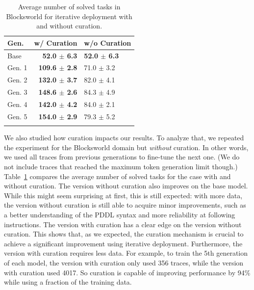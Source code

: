 \begin{table}
\vspace{-10pt}
\centering
\begin{tabular}{lrl}
\toprule
\textbf{Gen.} & \textbf{w/ Curation}     & \textbf{w/o Curation}   \\ \midrule
Base          & \textbf{52.0 $\pm$ 6.3}  & \textbf{52.0 $\pm$ 6.3} \\
Gen. 1        & \textbf{109.6 $\pm$ 2.8} & 71.0 $\pm$ 3.2          \\
Gen. 2        & \textbf{132.0 $\pm$ 3.7} & 82.0 $\pm$ 4.1          \\
Gen. 3        & \textbf{148.6 $\pm$ 2.6} & 84.3 $\pm$ 4.9          \\
Gen. 4        & \textbf{142.0 $\pm$ 4.2} & 84.0 $\pm$ 2.1          \\
Gen. 5        & \textbf{154.0 $\pm$ 2.9} & 79.3 $\pm$ 5.2          \\
\bottomrule                                                        \\
\end{tabular}
\caption{Average number of solved tasks in Blocksworld for iterative deployment
  with and without curation.
}
\label{tab:no-curation}
\vspace{-1pt}
\end{table}


We also studied how curation impacts our results. To analyze that, we repeated
the experiment for the Blocksworld domain but \emph{without} curation. In other words,
we used all traces from previous generations to fine-tune the next one. (We do
not include traces that reached the maximum token generation limit though.)
Table~\ref{tab:no-curation} compares the average number of solved tasks for the
case with and without curation. The version without curation also improves on
the base model. While this might seem surprising at first, this is still
expected: with more data, the version without curation is still able to acquire
minor improvements, such as a better understanding of the PDDL syntax and more
reliability at following instructions.
The version with curation has a clear edge on the version without curation. This
shows that, as we expected, the curation mechanism is crucial to achieve a
significant improvement using iterative deployment.
Furthermore, the version with curation requires less data. For example, to train
the 5th generation of each model, the version with curation only used 356
traces, while the version with curation used 4017. So curation is capable of
improving performance by 94\% while using a fraction of the training data.









